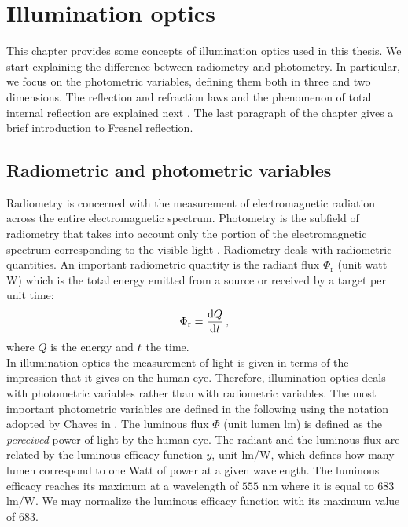 \chapter{Illumination optics}\label{chap:Illumination optics}
This chapter provides some concepts of illumination optics used in this thesis. We start explaining the difference between radiometry and photometry.
In particular, we focus on the photometric variables, defining them both in three and two dimensions. The reflection and refraction laws and the phenomenon of total internal reflection are explained next . The last paragraph of the chapter gives a brief introduction to Fresnel reflection. 
\section{Radiometric and photometric variables}\label{sec:photometry}
Radiometry is concerned with the measurement of electromagnetic radiation across the entire electromagnetic spectrum. Photometry is the subfield of radiometry that takes into account only the portion of the electromagnetic spectrum corresponding to the visible light \cite{zalewski1995radiometry}. Radiometry deals with radiometric quantities. An important radiometric quantity  is the radiant flux $\Phi_{\textrm{r}}$ (unit watt \textrm{W}) which is the total energy emitted from a source or received by a target per unit time:
\begin{equation}
\Phi_{\textrm{r}} = \frac{\textrm{d}Q}{\textrm{d}t}\,,
\end{equation}
where $Q$ is the energy and $t$ the time.\\
\indent In illumination optics the measurement of light is given in terms of the impression that it gives on the human eye. Therefore, illumination optics deals with photometric variables rather than with radiometric variables. The most important photometric variables are defined in the following using the notation adopted by Chaves in \cite{chaves2015introduction}. The luminous flux $\Phi$ (unit lumen \textrm{lm}) is defined as the \textit{perceived} power of light by the human eye.
 The radiant and the luminous flux are related by the luminous efficacy function $y$, unit \textrm{lm}/\textrm{W}, which defines how many lumen correspond to one Watt of power at a given wavelength.
 The luminous efficacy reaches its maximum  at a wavelength of $555$ $\textrm{nm}$ where it is equal to $683$ $\textrm{lm}/\textrm{W}$.
  We may normalize the luminous efficacy function with its maximum value of $683$.
